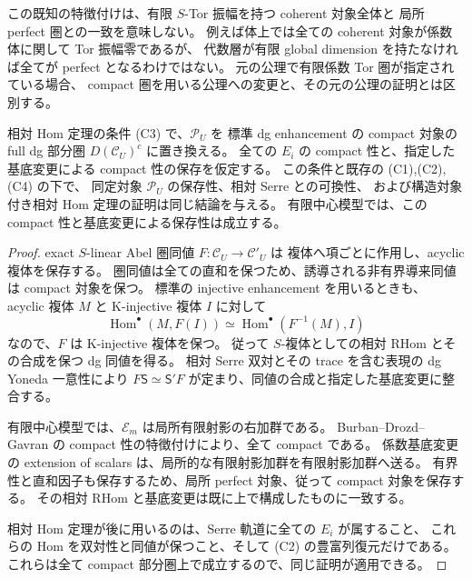 この既知の特徴付けは、有限 $S$-Tor 振幅を持つ coherent 対象全体と
局所 perfect 圏との一致を意味しない。
例えば体上では全ての coherent 対象が係数体に関して Tor 振幅零であるが、
代数層が有限 global dimension を持たなければ全てが perfect となるわけではない。
元の公理で有限係数 Tor 圏が指定されている場合、
compact 圏を用いる公理への変更と、その元の公理の証明とは区別する。

\begin{lemma}
\label{lem:relative-serre-compact-intrinsic}
相対 Hom 定理の条件 \textup{(C3)} で、$\mathcal P_U$ を
標準 dg enhancement の compact 対象の full dg 部分圏
$D(\mathcal C_U)^c$ に置き換える。
全ての $E_i$ の compact 性と、指定した基底変更による compact 性の保存を仮定する。
この条件と既存の \textup{(C1),(C2),(C4)} の下で、
同定対象 $\mathcal P_U$ の保存性、相対 Serre との可換性、
および構造対象付き相対 Hom 定理の証明は同じ結論を与える。
有限中心模型では、この compact 性と基底変更による保存性は成立する。
\end{lemma}

\begin{proof}
exact $S$-linear Abel 圏同値 $F:\mathcal C_U\to\mathcal C'_U$ は
複体へ項ごとに作用し、acyclic 複体を保存する。
圏同値は全ての直和を保つため、誘導される非有界導来同値は compact 対象を保つ。
標準の injective enhancement を用いるときも、
acyclic 複体 $M$ と K-injective 複体 $I$ に対して
\[
 \operatorname{Hom}^{\bullet}(M,F(I))
 \simeq\operatorname{Hom}^{\bullet}(F^{-1}(M),I)
\]
なので、$F$ は K-injective 複体を保つ。
従って $S$-複体としての相対 RHom とその合成を保つ dg 同値を得る。
相対 Serre 双対とその trace を含む表現の dg Yoneda 一意性により
$F\mathsf S\simeq\mathsf S'F$ が定まり、同値の合成と指定した基底変更に整合する。

有限中心模型では、$\mathscr E_m$ は局所有限射影の右加群である。
Burban--Drozd--Gavran の compact 性の特徴付けにより、全て compact である。
係数基底変更の extension of scalars は、局所的な有限射影加群を有限射影加群へ送る。
有界性と直和因子も保存するため、局所 perfect 対象、従って compact 対象を保存する。
その相対 RHom と基底変更は既に上で構成したものに一致する。

相対 Hom 定理が後に用いるのは、Serre 軌道に全ての $E_i$ が属すること、
これらの Hom を双対性と同値が保つこと、そして \textup{(C2)} の豊富列復元だけである。
これらは全て compact 部分圏上で成立するので、同じ証明が適用できる。
\end{proof}

